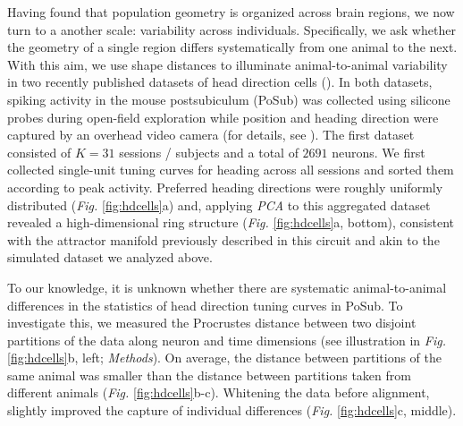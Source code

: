 Having found that population geometry is organized across brain regions, we now turn to a another scale: variability across individuals. Specifically, we ask whether the geometry of a single region differs systematically from one animal to the next. With this aim, we use shape distances to illuminate animal-to-animal variability in two recently published datasets of head direction cells (\cite{duszkiewicz}).
In both datasets, spiking activity in the mouse postsubiculum (PoSub) was collected using silicone probes during open-field exploration while position and heading direction were captured by an overhead video camera (for details, see \cite{duszkiewicz}).
The first dataset consisted of $K = 31$ sessions / subjects and a total of $2691$ neurons.
We first collected single-unit tuning curves for heading across all sessions and sorted them according to peak activity.
Preferred heading directions were roughly uniformly distributed (\textit{Fig.} \ref{fig:hdcells}a) and, applying \textit{PCA} to this aggregated dataset revealed a high-dimensional ring structure (\textit{Fig.} \ref{fig:hdcells}a, bottom), consistent with the attractor manifold previously described in this circuit \parencite{chaudhuri2019intrinsic} and akin to the simulated dataset we analyzed above.

To our knowledge, it is unknown whether there are systematic animal-to-animal differences in the statistics of head direction tuning curves in PoSub.
To investigate this, we measured the Procrustes distance between two disjoint partitions of the data along neuron and time dimensions (see illustration in \textit{Fig.} \ref{fig:hdcells}b, left; \textit{Methods}).
On average, the distance between partitions of the same animal was smaller than the distance between partitions taken from different animals (\textit{Fig.} \ref{fig:hdcells}b-c).
Whitening the data before alignment, slightly improved the capture of individual differences (\textit{Fig.} \ref{fig:hdcells}c, middle). 

